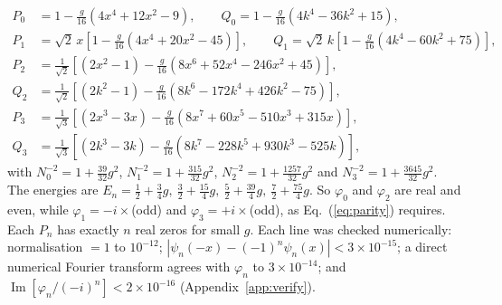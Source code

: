 \documentclass[11pt,a4paper]{article}
\newcommand{\Eq}[1]{Eq.~(#1)}
\begin{document}
\begin{align}
P_0&=1-\tfrac{g}{16}\left(4x^4+12x^2-9\right),\qquad Q_0=1-\tfrac{g}{16}\left(4k^4-36k^2+15\right),\label{eq:n0}\\
P_1&=\sqrt2\,x\left[1-\tfrac{g}{16}\left(4x^4+20x^2-45\right)\right],\qquad
Q_1=\sqrt2\,k\left[1-\tfrac{g}{16}\left(4k^4-60k^2+75\right)\right],\label{eq:n1}\\
P_2&=\tfrac{1}{\sqrt2}\left[(2x^2-1)-\tfrac{g}{16}\left(8x^6+52x^4-246x^2+45\right)\right],\nonumber\\
Q_2&=\tfrac{1}{\sqrt2}\left[(2k^2-1)-\tfrac{g}{16}\left(8k^6-172k^4+426k^2-75\right)\right],\label{eq:n2}\\
P_3&=\tfrac{1}{\sqrt3}\left[(2x^3-3x)-\tfrac{g}{16}\left(8x^7+60x^5-510x^3+315x\right)\right],\nonumber\\
Q_3&=\tfrac{1}{\sqrt3}\left[(2k^3-3k)-\tfrac{g}{16}\left(8k^7-228k^5+930k^3-525k\right)\right],\label{eq:n3}
\end{align}
with $N_0^{-2}=1+\tfrac{39}{32}g^2$, $N_1^{-2}=1+\tfrac{315}{32}g^2$, $N_2^{-2}=1+\tfrac{1257}{32}g^2$ and
$N_3^{-2}=1+\tfrac{3645}{32}g^2$.
The energies are $E_n=\tfrac12+\tfrac34g,\ \tfrac32+\tfrac{15}4g,\ \tfrac52+\tfrac{39}4g,\ \tfrac72+\tfrac{75}4g$.
So $\varphi_0$ and $\varphi_2$ are real and even, while $\varphi_1=-i\times$(odd) and
$\varphi_3=+i\times$(odd), as \Eq{\ref{eq:parity}} requires. Each $P_n$ has exactly $n$ real
zeros for small $g$. Each line was checked numerically: normalisation $=1$ to $10^{-12}$;
$|\psi_n(-x)-(-1)^n\psi_n(x)|<3\times10^{-15}$; a direct numerical Fourier transform agrees
with $\varphi_n$ to $3\times10^{-14}$; and $\operatorname{Im}[\varphi_n/(-i)^n]<2\times10^{-16}$
(Appendix~\ref{app:verify}).
\end{document}
